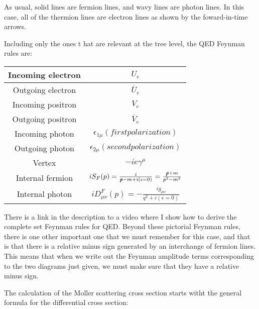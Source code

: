 \documentclass[a4]{article}
\begin{document}
    As usual, solid lines are fermion lines, and wavy lines are photon lines. In this case, all of the thermion lines are electron lines as shown by the foward-in-time arrows.

    Including only the ones t hat are relevant at the tree level, the QED Feynman rules are:

    \begin{center}
        \begin{tabular}[center]{|c|c|}
            \hline
            Incoming electron & $U_{e}$ \\
            \hline
            Outgoing electron & $\overline{U}_{e}$ \\
            \hline
            Incoming positron & $V_{e}$ \\
            \hline
            Outgoing positron & $\overline{V}_{e}$ \\
            \hline
            Incoming photon & $\epsilon_{1 \mu} (first polarization)$ \\
            \hline
            Outgoing photon & $\epsilon_{2 \mu} (second polarization)$ \\
            \hline
            Vertex & $-i e \gamma^{\mu}$ \\
            \hline
            Internal fermion & $i S_{F} (p) = \frac{i}{\slashed{p} - m + i (\epsilon = 0)} = \frac{\slashed{p} + m}{p^2 - m^2}$ \\
            \hline
            Internal photon & $i D^{F}_{\mu \nu} (p) = - \frac{i g_{\mu \nu}}{q^2 + i(\epsilon = 0)}$ \\
            \hline
        \end{tabular}
    \end{center}

    There is a link in the description to a video where I show how to derive the complete set Feynman rules for QED. Beyond these pictorial Feynman rules, there is one other important one that
    we must remember for this case, and that is that there is a relative minus sign generated by an interchange of fermion lines. This means that when we write out the Feynman amplitude terms 
    corresponding  to the two diagrams just given, we must make sure that they have a relative minus sign. 

    The calculation of the Moller scattering cross section starts witht the general formula for the differential cross section:

    \begin{center}
    \end{center}
\end{document}
